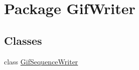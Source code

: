 \hypertarget{namespaceGifWriter}{\section{Package Gif\-Writer}
\label{namespaceGifWriter}
}
\subsection*{Classes}
\begin{DoxyCompactItemize}
\item 
class \hyperlink{classGifWriter_1_1GifSequenceWriter}{Gif\-Sequence\-Writer}
\end{DoxyCompactItemize}

